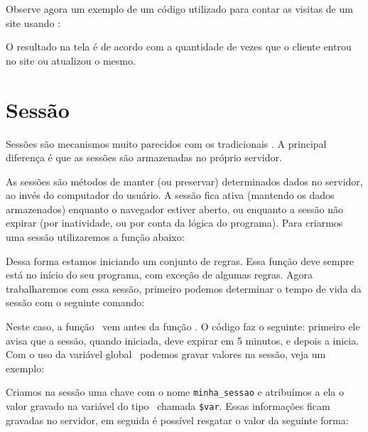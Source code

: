 

Observe agora um exemplo de um código utilizado para contar as visitas de um site 
usando \cookie:



O resultado na tela é de acordo com a quantidade de vezes que o cliente entrou no site 
ou atualizou o mesmo.

\section{Sessão}
\label{sessao}

Sessões são mecanismos muito parecidos com os tradicionais \cookies. A principal diferença é 
que as sessões são armazenadas no próprio servidor.

As sessões são métodos de manter (ou preservar) determinados dados no servidor, ao invés do computador 
do usuário. A sessão fica ativa (mantendo os dados armazenados) enquanto o navegador estiver aberto, 
ou enquanto a sessão não expirar (por inatividade, ou por conta da lógica do programa). Para criarmos 
uma sessão utilizaremos a função abaixo:



Dessa forma estamos iniciando um conjunto de regras. Essa função deve sempre está no início do 
seu programa, com exceção de algumas regras. Agora trabalharemos com essa sessão, primeiro podemos 
determinar o tempo de vida da sessão com o seguinte comando:



Neste caso, a função \funcaosessioncache~vem antes da função \funcaosessionstart. O código faz
o seguinte: primeiro ele avisa que a sessão, quando iniciada, deve expirar em 5 minutos, e depois a inicia.
Com o uso da variável global \variavelsession~podemos gravar valores na sessão, veja um exemplo:



Criamos na sessão uma chave com o nome \texttt{minha\_sessao} e atribuímos a ela o valor gravado na 
variável do tipo \tipostring~chamada \texttt{\$var}. Essas informações ficam gravadas no servidor, 
em seguida é possível resgatar o valor da seguinte forma:

